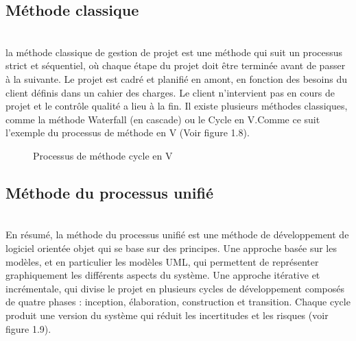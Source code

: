 \subsection{\Large Méthode   classique}
\texttt{}\\[0.1cm]
\textsf{\selectfont{}
 la méthode classique de gestion de projet est une méthode qui suit un processus strict et séquentiel, où chaque étape du projet doit être terminée avant de passer à la suivante. Le projet est cadré et planifié en amont, en fonction des besoins du client définis dans un cahier des charges. Le client n’intervient pas en cours de projet et le contrôle qualité a lieu à la fin. Il existe plusieurs méthodes classiques, comme la méthode Waterfall (en cascade) ou le Cycle en V.Comme ce suit l'exemple du processus de méthode en V (Voir figure 1.8)}.\\[0.1cm]
\texttt{}
\begin{figure}[H]
    \begin{center}
    
    \end{center}
    \caption{Processus de méthode cycle en V}
\end{figure}
\subsection{\Large Méthode  du processus unifié }
\texttt{}\\[0.2cm]
\textsf{\selectfont{}
En résumé, la méthode du processus unifié est une méthode de développement de logiciel orientée objet qui se base sur des principes.
Une approche basée sur les modèles, et en particulier les modèles UML, qui permettent de représenter graphiquement les différents aspects du système.
Une approche itérative et incrémentale, qui divise le projet en plusieurs cycles de développement composés de quatre phases : inception, élaboration, construction et transition. Chaque cycle produit une version du système qui réduit les incertitudes et les risques (voir figure 1.9). 
}

